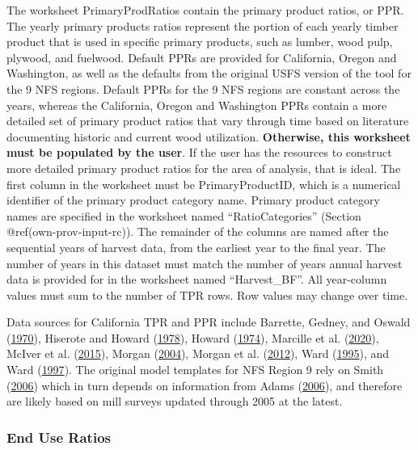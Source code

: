 \documentclass[
  openany]{book}
\begin{document}
The worksheet PrimaryProdRatios contain the primary product ratios, or
PPR. The yearly primary products ratios represent the portion of each
yearly timber product that is used in specific primary products, such as
lumber, wood pulp, plywood, and fuelwood. Default PPRs are provided for
California, Oregon and Washington, as well as the defaults from the
original USFS version of the tool for the 9 NFS regions. Default PPRs
for the 9 NFS regions are constant across the years, whereas the
California, Oregon and Washington PPRs contain a more detailed set of
primary product ratios that vary through time based on literature
documenting historic and current wood utilization. \textbf{Otherwise,
this worksheet must be populated by the user}. If the user has the
resources to construct more detailed primary product ratios for the area
of analysis, that is ideal. The first column in the worksheet must be
PrimaryProductID, which is a numerical identifier of the primary product
category name. Primary product category names are specified in the
worksheet named ``RatioCategories'' (Section @ref(own-prov-input-rc)).
The remainder of the columns are named after the sequential years of
harvest data, from the earliest year to the final year. The number of
years in this dataset must match the number of years annual harvest data
is provided for in the worksheet named ``Harvest\_BF''. All year-column
values must sum to the number of TPR rows. Row values may change over
time.

Data sources for California TPR and PPR include Barrette, Gedney, and
Oswald (\protect\hyperlink{ref-barrette1970}{1970}), Hiserote and Howard
(\protect\hyperlink{ref-hiserote1978}{1978}), Howard
(\protect\hyperlink{ref-howard1974}{1974}), Marcille et al.
(\protect\hyperlink{ref-marcille2020}{2020}), McIver et al.
(\protect\hyperlink{ref-mciver2015}{2015}), Morgan
(\protect\hyperlink{ref-morgan2004}{2004}), Morgan et al.
(\protect\hyperlink{ref-morgan2012}{2012}), Ward
(\protect\hyperlink{ref-ward1995}{1995}), and Ward
(\protect\hyperlink{ref-ward1997}{1997}). The original model templates
for NFS Region 9 rely on Smith (\protect\hyperlink{ref-smith2006}{2006})
which in turn depends on information from Adams
(\protect\hyperlink{ref-adams2006}{2006}), and therefore are likely
based on mill surveys updated through 2005 at the latest.

\hypertarget{own-prov-input-eur}{%
\subsubsection{End Use Ratios}\label{own-prov-input-eur}}
\end{document}
